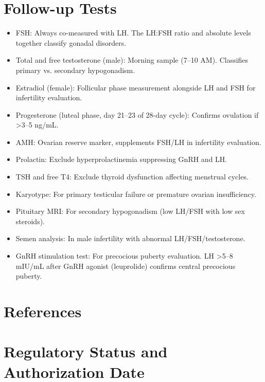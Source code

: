\section*{Follow-up Tests}
\begin{itemize}
  \item FSH: Always co-measured with LH. The LH:FSH ratio and absolute levels together classify gonadal disorders.
  \item Total and free testosterone (male): Morning sample (7--10 AM). Classifies primary vs. secondary hypogonadism.
  \item Estradiol (female): Follicular phase measurement alongside LH and FSH for infertility evaluation.
  \item Progesterone (luteal phase, day 21--23 of 28-day cycle): Confirms ovulation if >3--5 ng/mL.
  \item AMH: Ovarian reserve marker, supplements FSH/LH in infertility evaluation.
  \item Prolactin: Exclude hyperprolactinemia suppressing GnRH and LH.
  \item TSH and free T4: Exclude thyroid dysfunction affecting menstrual cycles.
  \item Karyotype: For primary testicular failure or premature ovarian insufficiency.
  \item Pituitary MRI: For secondary hypogonadism (low LH/FSH with low sex steroids).
  \item Semen analysis: In male infertility with abnormal LH/FSH/testosterone.
  \item GnRH stimulation test: For precocious puberty evaluation. LH >5--8 mIU/mL after GnRH agonist (leuprolide) confirms central precocious puberty.
\end{itemize}

\section*{References}



\clearpage
\section*{Regulatory Status and Authorization Date}

\clearpage
